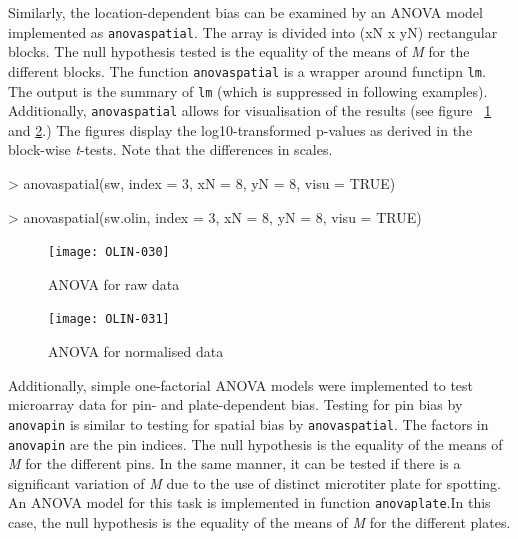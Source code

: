 \documentclass[a4paper,11pt]{article}
\begin{document}
Similarly, the location-dependent bias can be examined by an ANOVA model implemented as
\texttt{anovaspatial}. The array is divided into (xN x yN) rectangular blocks.   
The null hypothesis tested is the equality of the means of \emph{M} for the different blocks.  
The function \texttt{anovaspatial} is a wrapper around functipn \texttt{lm}. The output
is the summary of \texttt{lm} (which is suppressed in following examples).
Additionally,  \texttt{anovaspatial} allows for visualisation of the results (see figure
~\ref{anova} and \ref{anovaolin}.) The figures display the log10-transformed p-values
as derived in the block-wise \textit{t}-tests. Note that the differences in scales.   


\begin{Schunk}
\begin{Sinput}
> anovaspatial(sw, index = 3, xN = 8, yN = 8, visu = TRUE)
\end{Sinput}
\end{Schunk}

\begin{Schunk}
\begin{Sinput}
> anovaspatial(sw.olin, index = 3, xN = 8, yN = 8, visu = TRUE)
\end{Sinput}
\end{Schunk}

\begin{figure}[t]
\centering
\texttt{[image: OLIN-030]}
\caption{ANOVA for raw data}
\label{anova}
\end{figure}

\begin{figure}[t]
\centering
\texttt{[image: OLIN-031]}
\caption{ANOVA for normalised data}
\label{anovaolin}
\end{figure}


Additionally, simple one-factorial ANOVA 
models were implemented to test microarray data for  pin- and plate-dependent
bias. Testing for pin bias by \texttt{anovapin} is similar to testing for spatial 
bias by \texttt{anovaspatial}. The factors in \texttt{anovapin} are the pin indices.
The null hypothesis is the equality of the means of \emph{M} for the different pins.
In the same manner, it can be tested if there is a significant variation of \emph{M}
due to the use of distinct microtiter plate for spotting. An ANOVA model for this
task is implemented in function \texttt{anovaplate}.In this case, the null hypothesis 
is the equality of the means of \emph{M} for the different plates.
\end{document}
